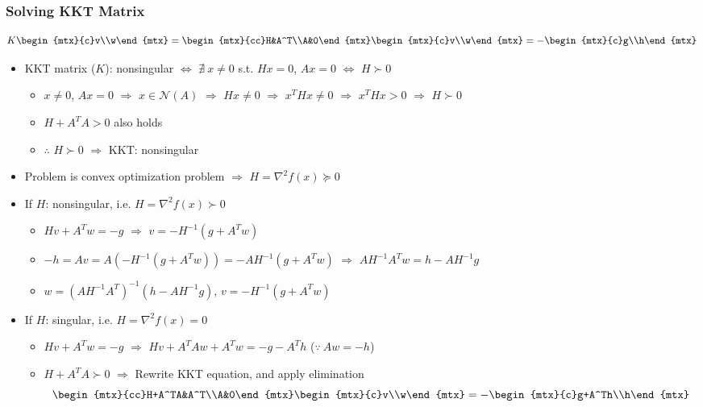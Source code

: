 \subsubsection*{Solving KKT Matrix}
$$ K\begin{mtx}{c}v\\w\end{mtx}=\begin{mtx}{cc}H&A^T\\A&0\end{mtx}\begin{mtx}{c}v\\w\end{mtx}=-\begin{mtx}{c}g\\h\end{mtx} $$
\begin{itemize}
    \item KKT matrix ($K$): nonsingular $\Leftrightarrow$ $\nexists~x\neq 0$ s.t. $Hx=0$, $Ax=0$ $\Leftrightarrow$ $H\succ 0$
    \begin{itemize}
        \item $x\neq 0$, $Ax=0$ $\Rightarrow$ $x\in\mathcal{N}(A)$ $\Rightarrow$ $Hx\neq 0$ $\Rightarrow$ $x^THx\neq 0$ $\Rightarrow$ $x^THx>0$ $\Rightarrow$ $H\succ 0$
        \item $H+A^TA>0$ also holds
        \item $\therefore$ $H\succ 0$ $\Rightarrow$ KKT: nonsingular
    \end{itemize}
    \item Problem is convex optimization problem $\Rightarrow$ $H=\nabla^2 f(x)\succeq 0$
    \item If $H$: nonsingular, i.e. $H=\nabla^2 f(x)\succ 0$
    \begin{itemize}
        \item $Hv+A^Tw=-g$ $\Rightarrow$ $v=-H^{-1}(g+A^Tw)$
        \item $-h=Av=A\left(-H^{-1}(g+A^Tw)\right)=-AH^{-1}(g+A^Tw)$ $\Rightarrow$ $AH^{-1}A^Tw=h-AH^{-1}g$
        \item $w=\left(AH^{-1}A^T\right)^{-1}\left(h-AH^{-1}g\right)$, $v=-H^{-1}\left(g+A^Tw\right)$
    \end{itemize}
    \item If $H$: singular, i.e. $H=\nabla^2 f(x)=0$
    \begin{itemize}
        \item $Hv+A^Tw=-g$ $\Rightarrow$ $Hv+A^TAw+A^Tw=-g-A^Th$ ($\because~Aw=-h$)
        \item $H+A^TA\succ 0$ $\Rightarrow$ Rewrite KKT equation, and apply elimination
        $$ \begin{mtx}{cc}H+A^TA&A^T\\A&0\end{mtx}\begin{mtx}{c}v\\w\end{mtx}=-\begin{mtx}{c}g+A^Th\\h\end{mtx} $$
    \end{itemize}
\end{itemize}

